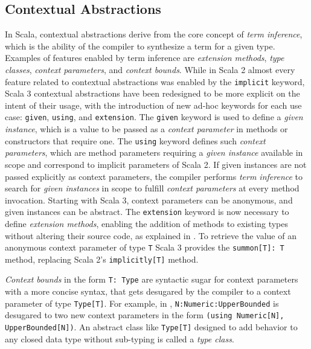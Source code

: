 \subsection{Contextual Abstractions} \label{chap:background->sec:scala3->subsec:contextual-abstractions}

In Scala, contextual abstractions derive from the core concept of \textit{term inference}, which is the ability of the compiler to synthesize a  term for a given type.
%
Examples of features enabled by term inference are \textit{extension methods}, \textit{type classes}, \textit{context parameters}, and \textit{context bounds}.
%
While in Scala 2 almost every feature related to contextual abstractions was enabled by the \texttt{implicit} keyword, Scala 3 contextual abstractions have been redesigned to be more explicit on the intent of their usage, with the introduction of new ad-hoc keywords for each use case: \texttt{given}, \texttt{using}, and \texttt{extension}.
%
The \texttt{given} keyword is used to define a \textit{given instance}, which is a value to be passed as a \textit{context parameter} in methods or constructors that require one.
%
The \texttt{using} keyword defines such \textit{context parameters}, which are method parameters requiring a \textit{given instance} available in scope and correspond to implicit parameters of Scala 2.
%
If given instances are not passed explicitly as context parameters, the compiler performs \textit{term inference} to search for \textit{given instances} in scope to fulfill \textit{context parameters} at every method invocation.
%
Starting with Scala 3, context parameters can be anonymous, and given instances can be abstract.
%
The \texttt{extension} keyword is now necessary to define \textit{extension methods}, enabling the addition of methods to existing types without altering their source code, as explained in .
%
To retrieve the value of an anonymous context parameter of type \texttt{T} Scala 3 provides the \texttt{summon[T]: T} method, replacing Scala 2's \texttt{implicitly[T]} method.

\textit{Context bounds} in the form \texttt{T: Type} are syntactic sugar for context parameters with a more concise syntax, that gets desugared by the compiler to a context parameter of type \texttt{Type[T]}.
%
For example, in , \texttt{N:Numeric:UpperBounded} is desugared to two new context parameters in the form \texttt{(using Numeric[N], UpperBounded[N])}.
%
An abstract class like \texttt{Type[T]} designed to add behavior to any closed data type without sub-typing is called a \textit{type class}.

